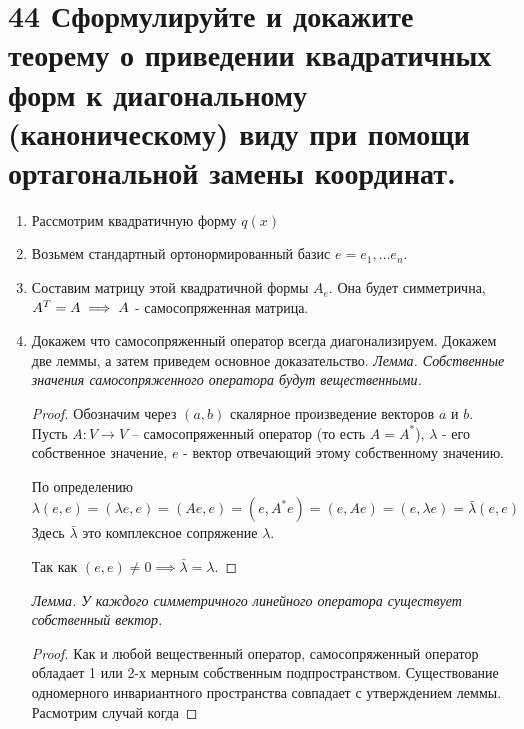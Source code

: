 \documentclass[a4paper,12pt,twoside]{article}
\begin{document}
\section{44 Сформулируйте и докажите теорему о приведении квадратичных форм к диагональному (каноническому) виду при помощи ортагональной замены координат. }
\begin{enumerate}
\item Рассмотрим квадратичную форму $q(x)$
\item Возьмем стандартный ортонормированный базис $e = {e_1, \dots e_n }$.
\item Составим матрицу этой квадратичной формы $A_e$. 
Она будет симметрична, $A^{{\small T}} = A  \implies A $ - самосопряженная матрица.

\item Докажем что самосопряженный оператор всегда диагонализируем.
Докажем две леммы, а затем приведем основное доказательство.
\emph{Лемма. Собственные значения самосопряженного оператора будут вещественными.}

\begin{proof} 
Обозначим через $ (a, b) $ скалярное произведение векторов $a$ и $b$. 
Пусть $A : V \rightarrow V $ – самосопряженный оператор (то есть $ A = A^{*}$), 
$ \lambda $ - его собственное значение, 
$ e $ - вектор отвечающий этому собственному значению.

По определению 
$ \lambda (e,e) = (\lambda e,e) = (Ae,e) = (e,A^{*} e) = (e,Ae) = (e,\lambda e) = \bar{\lambda} (e,e)$
Здесь $ \bar{\lambda} $ это комплексное сопряжение $ \lambda $. 

Так как $ (e,e) \neq 0 \implies \bar{\lambda} = \lambda $.
\end{proof}

\emph{Лемма. У каждого симметричного линейного оператора существует собственный вектор.}
\begin{proof}
Как и любой вещественный оператор, самосопряженный оператор 
обладает 1 или 2-х мерным собственным подпространством.
Существование одномерного инвариантного пространства совпадает с утверждением леммы.
Расмотрим случай когда 


\end{proof}



\end{enumerate}
\end{document}
